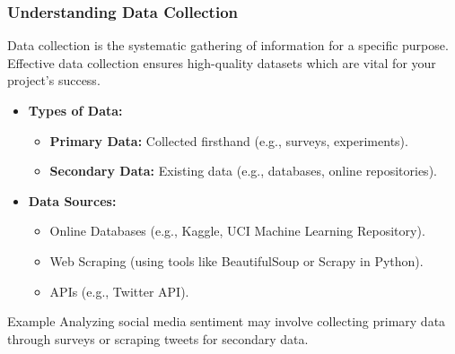 \documentclass[aspectratio=169]{beamer}
\begin{document}
\begin{frame}[fragile]
  \frametitle{Understanding Data Collection}
  Data collection is the systematic gathering of information for a specific purpose. 
  Effective data collection ensures high-quality datasets which are vital for your project’s success.

  \begin{itemize}
    \item \textbf{Types of Data:}
      \begin{itemize}
        \item \textbf{Primary Data:} Collected firsthand (e.g., surveys, experiments).
        \item \textbf{Secondary Data:} Existing data (e.g., databases, online repositories).
      \end{itemize}
      
    \item \textbf{Data Sources:}
      \begin{itemize}
        \item Online Databases (e.g., Kaggle, UCI Machine Learning Repository).
        \item Web Scraping (using tools like BeautifulSoup or Scrapy in Python).
        \item APIs (e.g., Twitter API).
      \end{itemize}
  \end{itemize}

  \begin{block}{Example}
    Analyzing social media sentiment may involve collecting primary data through surveys 
    or scraping tweets for secondary data.
  \end{block}
\end{frame}
\end{document}
